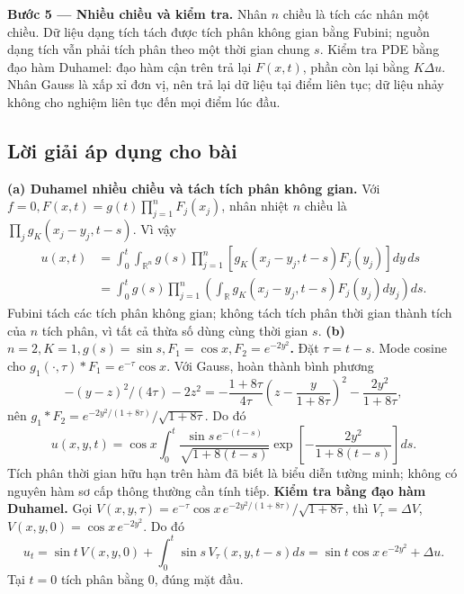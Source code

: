 \documentclass[10pt,a4paper]{article}
\begin{document}
\textbf{Bước 5 — Nhiều chiều và kiểm tra.} Nhân $n$ chiều là tích các nhân một chiều. Dữ liệu dạng tích tách được tích phân không gian bằng Fubini; nguồn dạng tích vẫn phải tích phân theo một thời gian chung $s$. Kiểm tra PDE bằng đạo hàm Duhamel: đạo hàm cận trên trả lại $F(x,t)$, phần còn lại bằng $K\Delta u$. Nhân Gauss là xấp xỉ đơn vị, nên trả lại dữ liệu tại điểm liên tục; dữ liệu nhảy không cho nghiệm liên tục đến mọi điểm lúc đầu.
\subsection*{Lời giải áp dụng cho bài}
\textbf{(a) Duhamel nhiều chiều và tách tích phân không gian.}
Với $f=0,F(x,t)=g(t)\prod_{j=1}^nF_j(x_j)$, nhân nhiệt $n$ chiều là $\prod_jg_K(x_j-y_j,t-s)$. Vì vậy
\begin{align*}
u(x,t)&=\int_0^t\!\int_{\mathbb R^n}
g(s)\prod_{j=1}^n[g_K(x_j-y_j,t-s)F_j(y_j)]dy\,ds\\
&=\int_0^tg(s)\prod_{j=1}^n
\left(\int_{\mathbb R}g_K(x_j-y_j,t-s)F_j(y_j)dy_j\right)ds.
\end{align*}
Fubini tách các tích phân không gian; không tách tích phân thời gian thành tích của $n$ tích phân, vì tất cả thừa số dùng cùng thời gian $s$.
\textbf{(b) $n=2,K=1,g(s)=\sin s,F_1=\cos x,F_2=e^{-2y^2}$.}
Đặt $\tau=t-s$. Mode cosine cho $g_1(\cdot,\tau)*F_1=e^{-\tau}\cos x$. Với Gauss, hoàn thành bình phương
\[-(y-z)^2/(4\tau)-2z^2
=-\frac{1+8\tau}{4\tau}\left(z-\frac y{1+8\tau}\right)^2
-\frac{2y^2}{1+8\tau},\]
nên $g_1*F_2=e^{-2y^2/(1+8\tau)}/\sqrt{1+8\tau}$. Do đó
\[u(x,y,t)=\cos x\int_0^t
\frac{\sin s\,e^{-(t-s)}}{\sqrt{1+8(t-s)}}
\exp\left[-\frac{2y^2}{1+8(t-s)}\right]ds.\]
Tích phân thời gian hữu hạn trên hàm đã biết là biểu diễn tường minh; không có nguyên hàm sơ cấp thông thường cần tính tiếp.
\textbf{Kiểm tra bằng đạo hàm Duhamel.}
Gọi $V(x,y,\tau)=e^{-\tau}\cos x\,e^{-2y^2/(1+8\tau)}/\sqrt{1+8\tau}$, thì $V_\tau=\Delta V$, $V(x,y,0)=\cos x\,e^{-2y^2}$. Do đó
\[u_t=\sin t\,V(x,y,0)+\int_0^t\sin s\,V_\tau(x,y,t-s)ds
=\sin t\cos x\,e^{-2y^2}+\Delta u.\]
Tại $t=0$ tích phân bằng $0$, đúng mặt đầu.
\end{document}
